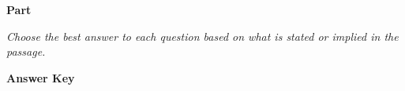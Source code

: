 \documentclass[../Exercise.tex]{subfiles}
\begin{document}
\begin{center}
	\large{\textbf{Part }}
\end{center} 
\vspace{5ex}
\noindent \textit{Choose the best answer to each question based on what is stated or implied in the passage.}
\vspace{7ex}
\begin{framed}
\textbf{Answer Key}
\end{framed}
\vspace{7ex}
\end{document}
